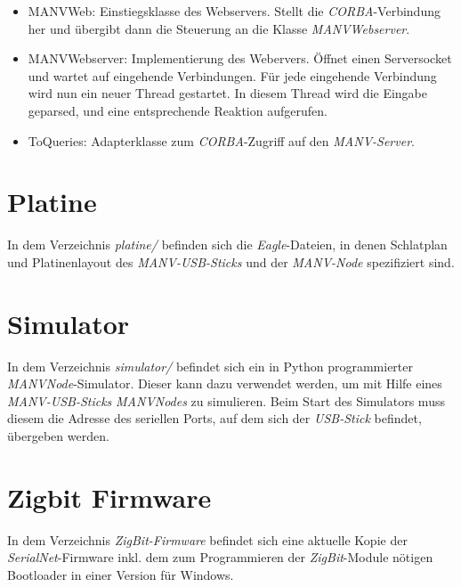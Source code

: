     \begin{itemize}
        \item{MANVWeb:} Einstiegsklasse des Webservers. Stellt die \emph{CORBA}-Verbindung her
                        und übergibt dann die Steuerung an die Klasse \emph{MANVWebserver}.
        \item{MANVWebserver:} Implementierung des Webervers. Öffnet einen Serversocket und
                              wartet auf eingehende Verbindungen. Für jede eingehende Verbindung
                              wird nun ein neuer Thread gestartet. In diesem Thread
                              wird die Eingabe geparsed, und eine entsprechende Reaktion
                              aufgerufen. 
        \item{ToQueries:} Adapterklasse zum \emph{CORBA}-Zugriff auf den \emph{MANV-Server}. 
    \end{itemize}

    \section{Platine}

    In dem Verzeichnis \emph{platine/} befinden sich die \emph{Eagle}-Dateien, in 
    denen Schlatplan und Platinenlayout des \emph{MANV-USB-Sticks} und der
    \emph{MANV-Node} spezifiziert sind.

    \section{Simulator}

    In dem Verzeichnis \emph{simulator/} befindet sich ein in Python programmierter
    \emph{MANVNode}-Simulator. Dieser kann dazu verwendet werden, um mit Hilfe
    eines \emph{MANV-USB-Sticks} \emph{MANVNodes} zu simulieren. Beim Start des
    Simulators muss diesem die Adresse des seriellen Ports, auf dem sich der
    \emph{USB-Stick} befindet, übergeben werden.

    \section{Zigbit Firmware}
    In dem Verzeichnis \emph{ZigBit-Firmware} befindet sich eine aktuelle Kopie der
    \emph{SerialNet}-Firmware inkl. dem zum Programmieren der \emph{ZigBit}-Module
    nötigen Bootloader in einer Version für Windows.
